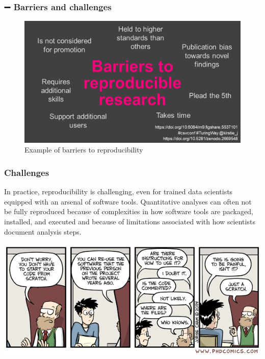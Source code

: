\documentclass[
  letterpaper,
  DIV=11,
  numbers=noendperiod]{scrreprt}
\begin{document}
\hypertarget{barriers-and-challenges}{%
\subsubsection{\texorpdfstring{{➖} Barriers and
challenges}{➖ Barriers and challenges}}\label{barriers-and-challenges}}

\begin{figure}

{\centering \includegraphics{./images/paste-80DE769E.png}

}

\caption{\label{fig-barriers-reproducibility}Example of barriers to
reproducibility}

\end{figure}

\hypertarget{challenges}{%
\subsubsection{Challenges}\label{challenges}}

In practice, reproducibility is challenging, even for trained data
scientists equipped with an arsenal of software tools. Quantitative
analyses can often not be fully reproduced because of complexities in
how software tools are packaged, installed, and executed and because of
limitations associated with how scientists document analysis steps.

\includegraphics{./images/phd_comics_code_documentation.png}
\end{document}
